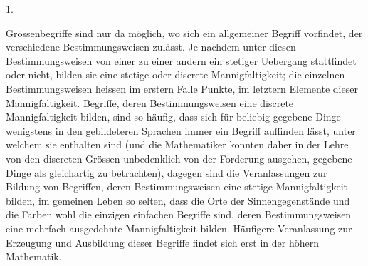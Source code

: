 \documentclass[a4paper,12pt]{article}
\begin{document}
\medbreak

\centerline{1.}

\nobreak\medskip

Gr\"{o}ssenbegriffe sind nur da m\"{o}glich, wo sich ein
allgemeiner Begriff vorfindet, der verschiedene Bestimmungsweisen
zul\"{a}sst.  Je nachdem unter diesen Bestimmungsweisen von einer
zu einer andern ein stetiger Uebergang stattfindet oder nicht,
bilden sie eine stetige oder discrete Mannigfaltigkeit; die
einzelnen Bestimmungsweisen heissen im erstern Falle Punkte, im
letztern Elemente dieser Mannigfaltigkeit.  Begriffe, deren
Bestimmungsweisen eine discrete Mannigfaltigkeit bilden, sind so
h\"{a}ufig, dass sich f\"{u}r beliebig gegebene Dinge wenigstens
in den gebildeteren Sprachen immer ein Begriff auffinden
l\"{a}sst, unter welchem sie enthalten sind (und die Mathematiker
konnten daher in der Lehre von den discreten Gr\"{o}ssen
unbedenklich von der Forderung ausgehen, gegebene Dinge als
gleichartig zu betrachten), dagegen sind die Veranlassungen zur
Bildung von Begriffen, deren Bestimmungsweisen eine stetige
Mannigfaltigkeit bilden, im gemeinen Leben so selten, dass die
Orte der Sinnengegenst\"{a}nde und die Farben wohl die einzigen
einfachen Begriffe sind, deren Bestimmungsweisen eine mehrfach
ausgedehnte Mannigfaltigkeit bilden.  H\"{a}ufigere Veranlassung
zur Erzeugung und Ausbildung dieser Begriffe findet sich erst in
der h\"{o}hern Mathematik.
\end{document}
